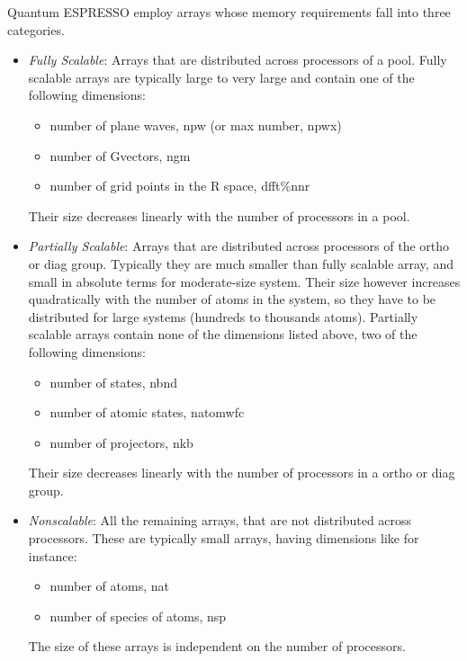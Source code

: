 \documentclass[12pt,a4paper]{article}
\begin{document}
Quantum ESPRESSO employ arrays whose memory requirements fall
into three categories.
\begin{itemize}
\item {\em Fully Scalable}:
Arrays that are distributed across processors of a pool.
Fully scalable arrays are typically large to very large and contain one
of the following dimensions:
\begin{itemize}
\item number of plane waves, npw (or max number, npwx)
\item number of Gvectors, ngm
\item number of grid points in the R space, dfft\%nnr
\end{itemize}
Their size decreases linearly with the number of processors in a pool.

\item {\em Partially Scalable}:
Arrays that are distributed across processors of the
ortho or diag group. Typically they are much smaller than fully scalable
array, and small in absolute terms for moderate-size system. Their size
however increases quadratically with the number of atoms in the system,
so they have to be distributed for large systems (hundreds to thousands
atoms). Partially scalable arrays contain none of the dimensions listed
above, two of the following dimensions:
\begin{itemize}
\item number of states, nbnd
\item number of atomic states, natomwfc
\item number of projectors, nkb
\end{itemize}
Their size decreases linearly with the number of processors in a ortho
or diag group.

\item
{\em Nonscalable}: All the remaining arrays, that are not distributed across
processors. These are typically small arrays, having dimensions like for
instance:
\begin{itemize}
\item number of atoms, nat
\item number of species of atoms, nsp
\end{itemize}
The size of these arrays is independent on the number of processors.
\end{itemize}

\end{document}
